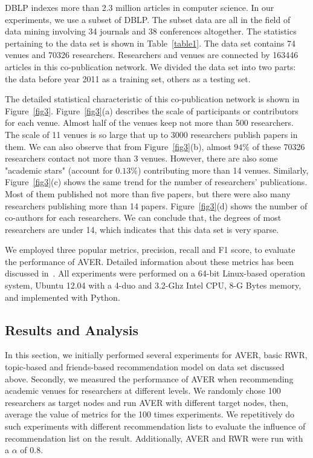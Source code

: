 \documentclass{sig-alternate-2013}
\begin{document}
DBLP indexes more than 2.3 million articles in computer science. In our experiments, we use a subset of DBLP. The subset data are all in the field of data mining involving 34 journals and 38 conferences altogether. The statistics pertaining to the data set is shown in Table~\ref{table1}. The data set contains 74 venues and 70326 researchers. Researchers and venues are connected by 163446 articles in this co-publication network. We divided the data set into two parts: the data before year 2011 as a training set, others as a testing set.

The detailed statistical characteristic of this co-publication network is shown in Figure~\ref{fig3}. Figure~\ref{fig3}(a) describes the scale of participants or contributors for each venue. Almost half of the venues keep not more than 500 researchers. The scale of 11 venues is so large that up to 3000 researchers publish papers in them. We can also observe that from Figure~\ref{fig3}(b), almost $94\%$ of these 70326 researchers contact not more than 3 venues. However, there are also some "academic stars" (account for $0.13\%$) contributing more than 14 venues. Similarly, Figure~\ref{fig3}(c) shows the same trend for the number of researchers' publications. Most of them published not more than five papers, but there were also many researchers publishing more than 14 papers. Figure~\ref{fig3}(d) shows the number of co-authors for each researchers. We can conclude that, the degrees of most researchers are under 14, which indicates that this data set is very sparse.

We employed three popular metrics, precision, recall and F1 score, to evaluate the performance of AVER. Detailed information about these metrics has been discussed in~\cite{xia2014mvcwalker}. All experiments were performed on a 64-bit Linux-based operation system, Ubuntu 12.04 with a 4-duo and 3.2-Ghz Intel CPU, 8-G Bytes memory, and implemented with Python.

\subsection{Results and Analysis}
In this section, we initially performed several experiments for AVER, basic RWR, topic-based and friends-based recommendation model on data set discussed above. Secondly, we measured the performance of AVER when recommending academic venues for researchers at different levels. We randomly chose 100 researchers as target nodes and run AVER with different target nodes, then, average the value of metrics for the 100 times experiments. We repetitively do such experiments with different recommendation lists to evaluate the influence of recommendation list on the result. Additionally, AVER and RWR were run with a $\alpha$ of 0.8.
\end{document}
